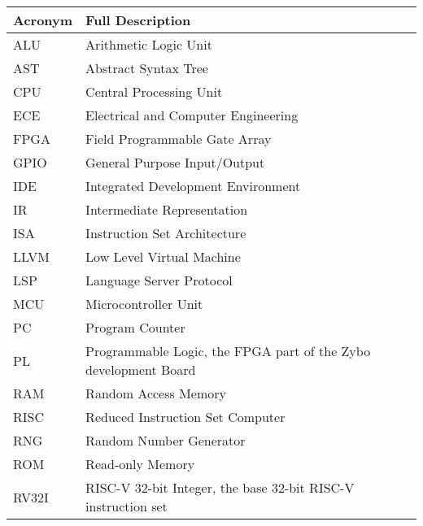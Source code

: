 \begin{table}[H]
	\begin{tabularx}{\textwidth}{| a | x |}
		\hline
		\textbf{Acronym} & \textbf{Full Description}                                       \\
		\hline

		ALU              & Arithmetic Logic Unit                                           \\
		AST              & Abstract Syntax Tree                                            \\
		CPU              & Central Processing Unit                                         \\
		ECE              & Electrical and Computer Engineering                             \\
		FPGA             & Field Programmable Gate Array                                   \\
		GPIO             & General Purpose Input/Output                                    \\
		IDE              & Integrated Development Environment                              \\
		IR               & Intermediate Representation                                     \\
		ISA              & Instruction Set Architecture                                    \\
		LLVM             & Low Level Virtual Machine                                       \\
		LSP              & Language Server Protocol                                        \\
		MCU              & Microcontroller Unit                                            \\
		PC               & Program Counter                                                 \\
		PL               & Programmable Logic, the FPGA part of the Zybo development Board \\
		RAM              & Random Access Memory                                            \\
		RISC             & Reduced Instruction Set Computer                                \\
		RNG              & Random Number Generator                                         \\
		ROM              & Read-only Memory                                                \\
		RV32I            & RISC-V 32-bit Integer, the base 32-bit RISC-V instruction set   \\%

		\hline
	\end{tabularx}
\end{table}

